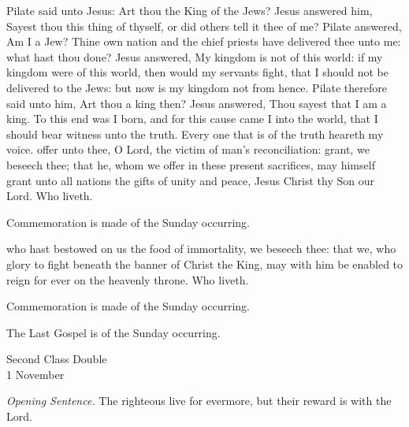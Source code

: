 

 Pilate said unto Jesus: Art thou the King of the Jews? Jesus answered him, Sayest thou this thing of thyself, or did others tell it thee of me? Pilate answered, Am I a Jew? Thine own nation and the chief priests have delivered thee unto me: what hast thou done? Jesus answered, My kingdom is not of this world: if my kingdom were of this world, then would my servants fight, that I should not be delivered to the Jews: but now is my kingdom not from hence. Pilate therefore said unto him, Art thou a king then? Jesus answered, Thou sayest that I am a king. To this end was I born, and for this cause came I into the world, that I should bear witness unto the truth. Every one that is of the truth heareth my voice.
\secret
{} offer unto thee, O Lord, the victim of man's reconciliation: grant, we beseech thee; that he, whom we offer in these present sacrifices, may himself grant unto all nations the gifts of unity and peace, Jesus Christ thy Son our Lord. Who liveth.
\begin{rubric}
    Commemoration is made of the Sunday occurring.
\end{rubric}
\postcommunion
{} who hast bestowed on us the food of immortality, we beseech thee: that we, who glory to fight beneath the banner of Christ the King, may with him be enabled to reign for ever on the heavenly throne. Who liveth.
\begin{rubric}
    Commemoration is made of the Sunday occurring.
\end{rubric}
\begin{rubric}
    The Last Gospel is of the Sunday occurring.
\end{rubric}

\begin{inhead}
    {Second Class Double\\
1 November}
\end{inhead}
\par\noindent
\textit{Opening Sentence.} The righteous live for evermore, but their reward is with the Lord.%

